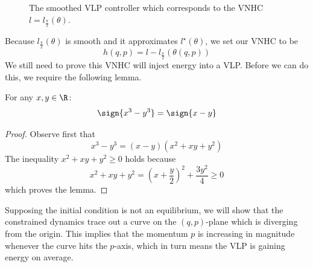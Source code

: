 \begin{figure}
   \centering
   
   \caption{The smoothed VLP controller which corresponds to the VNHC \(l =
      l_\frac{\pi}{2}(\theta)\).}\label{fig:vlp-smoothed-controller}
\end{figure}

Because \(l_\frac{\pi}{2}(\theta)\) is smooth and it approximates
\(l^\star(\theta)\), we set our VNHC to be
\[
   h(q,p) = l - l_\frac{\pi}{2}\left(\theta(q,p)\right)
\]
We still need to prove this VNHC will inject energy into a VLP. 
Before we can do this, we require the following lemma.

\begin{lemma}\label{lemma:sign-of-cube}
   For any \(x,y \in \R\):
   \[
      \sign{x^3 - y^3} = \sign{x-y}
   \]
\end{lemma}
\begin{proof}
   Observe first that
   \[
      x^3 - y^3 =  (x-y)(x^2 + xy + y^2)
   \]
   The inequality \(x^2 + xy + y^2 \geq 0\) holds because
   \[
      x^2 + xy + y^2 = \left(x  + \frac{y}{2}\right)^2 + \frac{3y^2}{4} \geq 0
   \]
   which proves the lemma.
\end{proof}

Supposing the initial condition is not an equilibrium, we will show that the
constrained dynamics trace out a curve on the \((q,p)\)-plane which is diverging
from the origin.  
This implies that the momentum \(p\) is increasing in magnitude whenever the
curve hits the \(p\)-axis, which in turn means the VLP is gaining energy on
average.

